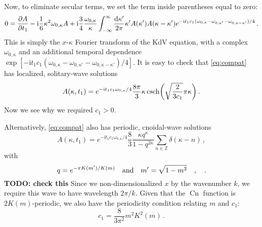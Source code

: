 \documentclass{jfm}
\DeclareMathOperator{\cn}{Cn}
\newcommand{\im}{\mathrm{i}}
\begin{document}
Now, to eliminate secular terms, we set the term inside parentheses
equal to zero:
\begin{equation}
  0 = \pdv{A}{t_1} - \im \frac{1}{6} \kappa^2 \omega_{0,\kappa} A
    + \im \frac{3}{4} \frac{\omega_{0,\kappa}}{\kappa}
    \int_{-\infty}^{\infty} \frac{\dd{\kappa'}}{2 \pi}
    \kappa' A(\kappa') A(\kappa-\kappa')
    e^{-\im t_1 c_1 (\omega_{0,\kappa} - \omega_{0,\kappa'} -
    \omega_{0,\kappa-\kappa'})/4}
    \,.
  \label{eq:compat}
\end{equation}
This is simply the $x$-$\kappa$ Fourier transform of the KdV equation,
with a complex $\omega_{0,\kappa}$ and an additional temporal dependence
$\exp[-\im t_1 c_1 (\omega_{0,\kappa} - \omega_{0,\kappa'} -
\omega_{0,\kappa-\kappa'})/4]$.
It is easy to check that \cref{eq:compat} has localized, solitary-wave
solutions~\citep{miles1976damping}
\begin{equation}
  A(\kappa, t_1) = e^{-\im t_1 c_1 \omega_{0,\kappa}/4}
  \frac{8 \pi}{3} \kappa \csch( \sqrt{\frac{2}{3 c_1}} \pi \kappa)
  \,.
  \label{eq:A_strong_sol}
\end{equation}
Now we see why we required $c_1 > 0$.

Alternatively, \cref{eq:compat} also has periodic, cnoidal-wave
solutions~\citep{miles1976damping}
\begin{equation}
  A(\kappa, t_1) = e^{-\im t_1 c_1 \omega_{0,\kappa}/4}
  \frac{8}{3} \frac{\kappa q^{\kappa}}{1-q^{2\kappa}} \sum_{n \in
  \mathbb{Z}} \delta(\kappa - n) \,,
  \label{eq:A_strong_sol_cnoidal}
\end{equation}
with
\[
  q = e^{-\pi K(m')/K(m)} \qq{and} m' = \sqrt{1-m^2} \qq{,} \,.
\]
\textbf{TODO: check this}
Since we non-dimensionalized $x$ by the wavenumber $k$, we require this
wave to have wavelength $2\pi/k$.
Given that the $\cn$ function is $2 K(m)$-periodic, we also have the
periodicity condition relating $m$ and $c_1$:
\[
  c_1 = \frac{8}{3 \pi^2} m^2 K^2(m) \,.
\]
\end{document}

